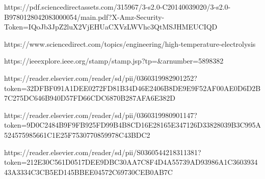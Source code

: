 \documentclass[11pt,letterpaper]{article}
\begin{document}
https://pdf.sciencedirectassets.com/315967/3-s2.0-C20140039020/3-s2.0-B9780128042083000054/main.pdf?X-Amz-Security-Token=IQoJb3JpZ2luX2VjEHUaCXVzLWVhc3QtMSJHMEUCIQD%

https://www.sciencedirect.com/topics/engineering/high-temperature-electrolysis

https://ieeexplore.ieee.org/stamp/stamp.jsp?tp=&arnumber=5898382

https://reader.elsevier.com/reader/sd/pii/0360319982901252?token=32DFBF091A1DEE0272FD81B34D46E2406B8DE9E9F52AF00AE0D6D2B7C275DC646B940D57FD66CDC6870B287AFA6E382D

https://reader.elsevier.com/reader/sd/pii/0360319980901147?token=9D0C2484B9F9FB925FD99B4B8CD16E28165E347126D33828039B3C995A524575985661C1E25F7530770859978C43BDC2

https://reader.elsevier.com/reader/sd/pii/S0360544218311381?token=212E30C561D0517DEE9DBC30AA7C8F4D4A55739AD93986A1C360393443A3334C3CB5ED145BBEE04572C69730CEB0AB7C

\pagebreak


\end{document}
